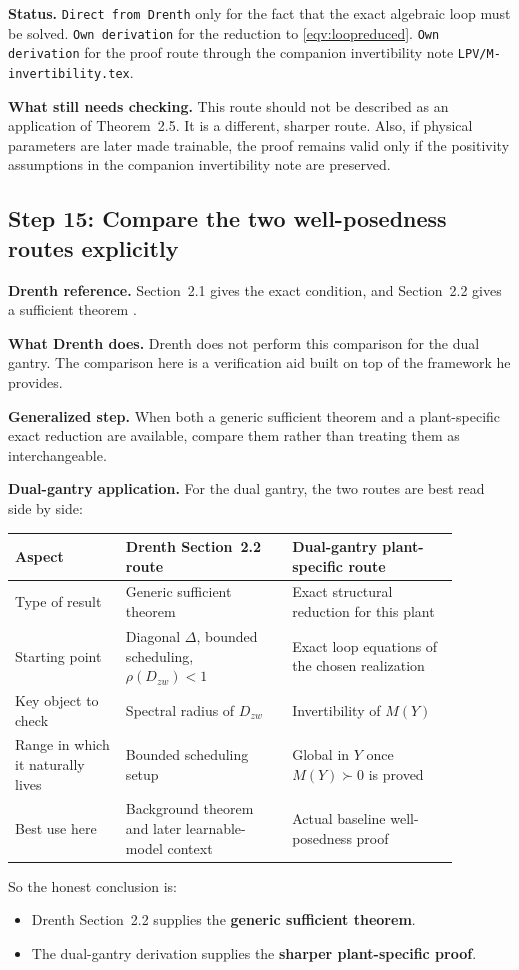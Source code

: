 ﻿\documentclass[11pt]{article}
\newcommand{\audititem}[2]{\par\smallskip\noindent\textbf{#1.} #2\par}
\newcommand{\statusline}[1]{\texttt{#1}}
\begin{document}
\audititem{Status}{\statusline{Direct from Drenth} only for the fact that the
exact algebraic loop must be solved. \statusline{Own derivation} for the
reduction to \eqref{eqv:loopreduced}. \statusline{Own derivation} for the proof
route through the companion invertibility note \texttt{LPV/M-invertibility.tex}.}

\audititem{What still needs checking}{This route should not be described as an
application of Theorem~2.5. It is a different, sharper route.
Also, if physical parameters are later made trainable, the proof remains valid
only if the positivity assumptions in the companion invertibility note are
preserved.}

\subsection{Step 15: Compare the two well-posedness routes explicitly}

\audititem{Drenth reference}{Section~2.1 gives the exact condition, and
Section~2.2 gives a sufficient theorem \cite{drenth2025thesis}.}

\audititem{What Drenth does}{Drenth does not perform this comparison for the
dual gantry. The comparison here is a verification aid built on top of the
framework he provides.}

\audititem{Generalized step}{When both a generic sufficient theorem and a
plant-specific exact reduction are available, compare them rather than treating
them as interchangeable.}

\audititem{Dual-gantry application}{For the dual gantry, the two routes are best
read side by side:
\begin{center}
\begin{tabular}{p{0.22\linewidth}p{0.33\linewidth}p{0.33\linewidth}}
\toprule
Aspect & Drenth Section~2.2 route & Dual-gantry plant-specific route \\
\midrule
Type of result & Generic sufficient theorem & Exact structural reduction for this plant \\
Starting point & Diagonal $\Delta$, bounded scheduling, $\rho(D_{zw})<1$ & Exact loop equations of the chosen realization \\
Key object to check & Spectral radius of $D_{zw}$ & Invertibility of $M(Y)$ \\
Range in which it naturally lives & Bounded scheduling setup & Global in $Y$ once $M(Y)\succ 0$ is proved \\
Best use here & Background theorem and later learnable-model context & Actual baseline well-posedness proof \\
\bottomrule
\end{tabular}
\end{center}
So the honest conclusion is:
\begin{itemize}[leftmargin=1.2em]
    \item Drenth Section~2.2 supplies the \textbf{generic sufficient theorem}.
    \item The dual-gantry derivation supplies the \textbf{sharper plant-specific
    proof}.
\end{itemize}}
\end{document}
